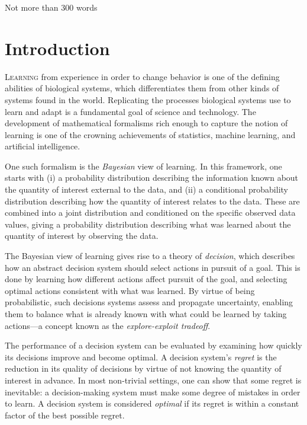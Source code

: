\documentclass[11pt]{book}
\begin{document}
Not more than 300 words

\tableofcontents





\chapter{Introduction}

\lettrine{L}{earning} from experience in order to change behavior is one of the defining abilities of biological systems, which differentiates them from other kinds of systems found in the world.
Replicating the processes biological systems use to learn and adapt is a fundamental goal of science and technology.
The development of mathematical formalisms rich enough to capture the notion of learning is one of the crowning achievements of statistics, machine learning, and artificial intelligence.

One such formalism is the \emph{Bayesian} view of learning.
In this framework, one starts with (i) a probability distribution describing the information known about the quantity of interest external to the data, and (ii) a conditional probability distribution describing how the quantity of interest relates to the data.
These are combined into a joint distribution and conditioned on the specific observed data values, giving a probability distribution describing what was learned about the quantity of interest by observing the data.

The Bayesian view of learning gives rise to a theory of \emph{decision}, which describes how an abstract decision system should select actions in pursuit of a goal.
This is done by learning how different actions affect pursuit of the goal, and selecting optimal actions consistent with what was learned.
By virtue of being probabilistic, such decisions systems assess and propagate uncertainty, enabling them to balance what is already known with what could be learned by taking actions---a concept known as the \emph{explore-exploit tradeoff}.

The performance of a decision system can be evaluated by examining how quickly its decisions improve and become optimal.
A decision system's \emph{regret} is the reduction in its quality of decisions by virtue of not knowing the quantity of interest in advance.
In most non-trivial settings, one can show that some regret is inevitable: a decision-making system must make some degree of mistakes in order to learn.
A decision system is considered \emph{optimal} if its regret is within a constant factor of the best possible regret.
\end{document}
